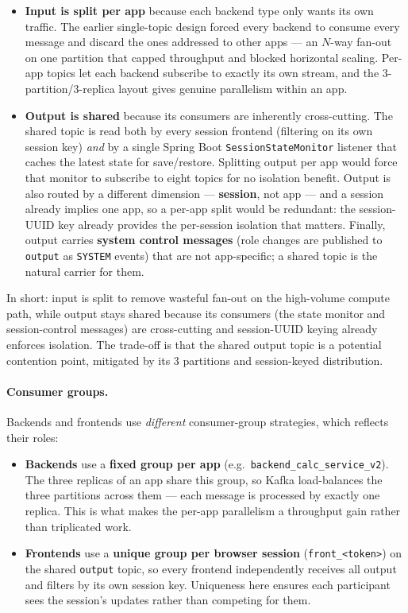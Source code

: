 \documentclass[12pt,a4paper]{article}
\begin{document}
\begin{itemize}[nosep]
  \item \textbf{Input is split per app} because each backend type only wants its own traffic. The earlier single-topic design forced every backend to consume every message and discard the ones addressed to other apps --- an $N$-way fan-out on one partition that capped throughput and blocked horizontal scaling. Per-app topics let each backend subscribe to exactly its own stream, and the 3-partition/3-replica layout gives genuine parallelism within an app.
  \item \textbf{Output is shared} because its consumers are inherently cross-cutting. The shared topic is read both by every session frontend (filtering on its own session key) \emph{and} by a single Spring Boot \texttt{SessionStateMonitor} listener that caches the latest state for save/restore. Splitting output per app would force that monitor to subscribe to eight topics for no isolation benefit. Output is also routed by a different dimension --- \textbf{session}, not app --- and a session already implies one app, so a per-app split would be redundant: the session-UUID key already provides the per-session isolation that matters. Finally, output carries \textbf{system control messages} (role changes are published to \texttt{output} as \texttt{SYSTEM} events) that are not app-specific; a shared topic is the natural carrier for them.
\end{itemize}

In short: input is split to remove wasteful fan-out on the high-volume compute path, while output stays shared because its consumers (the state monitor and session-control messages) are cross-cutting and session-UUID keying already enforces isolation. The trade-off is that the shared output topic is a potential contention point, mitigated by its 3 partitions and session-keyed distribution.

\paragraph{Consumer groups.} Backends and frontends use \emph{different} consumer-group strategies, which reflects their roles:

\begin{itemize}[nosep]
  \item \textbf{Backends} use a \textbf{fixed group per app} (e.g.\ \texttt{backend\_calc\_service\_v2}). The three replicas of an app share this group, so Kafka load-balances the three partitions across them --- each message is processed by exactly one replica. This is what makes the per-app parallelism a throughput gain rather than triplicated work.
  \item \textbf{Frontends} use a \textbf{unique group per browser session} (\texttt{front\_<token>}) on the shared \texttt{output} topic, so every frontend independently receives all output and filters by its own session key. Uniqueness here ensures each participant sees the session's updates rather than competing for them.
\end{itemize}
\end{document}
